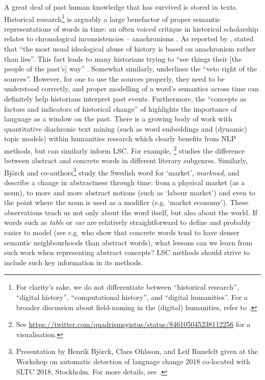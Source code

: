 \documentclass[output=paper]{langscibook}
\begin{document}
A great deal of past human knowledge that has survived is stored in texts.
Historical research\footnote{For clarity's sake, we do not differentiate between  ``historical research'', ``digital history'', ``computational history'', and ``digital humanities''. For a broader discussion about field-naming in the (digital) humanities, refer to \citet{piotrowski_2020}.} is arguably a large benefactor of proper semantic representations of words in time: an often voiced critique in historical scholarship relates to chronological inconsistencies -- anachronisms \citep{syrjamaki_sins_2011}. 
As reported by \citet{zosa2020disappearing}, \citet{hobsbawm_history_2011} stated that ``the most usual ideological abuse of history is based on anachronism rather than lies''. 
This fact leads to many historians trying to ``see things their [the people of the past's] way'' \citep{skinner_visions_2002}. 
Somewhat similarly, \citet{koselleck_vom_2010} underlines the ``veto right of the sources''. However, for one to use the sources properly, they need to be understood correctly, and proper modelling of a word's semantics across time can definitely help historians interpret past events. 
Furthermore, the ``concepts as factors and indicators of historical change'' of \citet[][80]{koselleck2004futures}  highlights the importance of language as a window on the past.
There is a growing body of work with quantitative diachronic text mining (such as word embeddings and (dynamic) topic models) within humanities research which clearly benefits from NLP methods, but can similarly inform LSC. 
For example, \citet{heuser2017word}\footnote{See \url{https://twitter.com/quadrismegistus/status/846105045238112256} for a visualisation.} studies the difference between abstract and concrete words in different literary subgenres.
Similarly, Björck and co-authors\footnote{Presentation by Henrik Björck, Claes Ohlsson, and Leif Runefelt given at the Workshop on automatic detection of language change 2018 co-located with SLTC 2018, Stockholm. For more details, see \citet{ohlsson2020market}.} study the Swedish word for `market', \emph{marknad}, and describe a change in abstractness through time: from a physical market (as a noun), to more and more abstract notions (such as `labour market') and even to the point where the noun is used as a modifier (e.g. `market economy'). These observations teach us not only about the word itself, but also about the world.
If words such as \emph{table} or \emph{car} are relatively straightforward to define and probably easier to model (see e.g. \citealt{reilly2017effects} who show that concrete words tend to have denser semantic neighbourhoods than abstract words), what lessons can we learn from such work when representing abstract concepts?
LSC methods should strive to include such key information in its methods.
\end{document}
